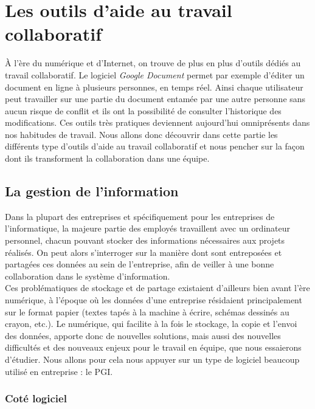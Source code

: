 \chapter{Les outils d'aide au travail collaboratif}

À l'ère du numérique et d'Internet, on trouve de plus en plus d'outils dédiés au travail collaboratif. Le logiciel \textit{Google Document} permet par exemple d'éditer un document en ligne à plusieurs personnes, en temps réel. Ainsi chaque utilisateur peut travailler sur une partie du document entamée par une autre personne sans aucun risque de conflit et ils ont la possibilité de consulter l'historique des modifications. Ces outils très pratiques deviennent aujourd'hui omniprésents dans nos habitudes de travail. Nous allons donc découvrir dans cette partie les différents type d'outils d'aide au travail collaboratif et nous pencher sur la façon dont ils transforment la collaboration dans une équipe.

\section{La gestion de l'information}

Dans la plupart des entreprises et spécifiquement pour les entreprises de l'informatique, la majeure partie des employés travaillent avec un ordinateur personnel, chacun pouvant stocker des informations nécessaires aux projets réalisés. On peut alors s'interroger sur la manière dont sont entreposées et partagées ces données au sein de l'entreprise, afin de veiller à une bonne collaboration dans le système d'information.\\

Ces problématiques de stockage et de partage existaient d'ailleurs bien avant l'ère numérique, à l'époque où les données d'une entreprise résidaient principalement sur le format papier (textes tapés à la machine à écrire, schémas dessinés au crayon, etc.). Le numérique, qui facilite à la fois le stockage, la copie et l'envoi des données, apporte donc de nouvelles solutions, mais aussi des nouvelles difficultés et des nouveaux enjeux pour le travail en équipe, que nous essaierons d'étudier. Nous allons pour cela nous appuyer sur un type de logiciel beaucoup utilisé en entreprise : le PGI.

\subsection{Coté logiciel}


